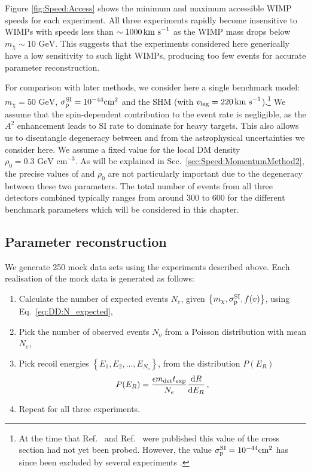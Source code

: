 Figure \ref{fig:Speed:Access} shows the minimum and maximum accessible WIMP speeds for each experiment. All three experiments rapidly become insensitive to WIMPs with speeds less than \(\sim 1000 \,\textrm{km s}^{-1}\) as the WIMP mass drops below \(m_\chi \sim 10 \textrm{ GeV}\). This suggests that the experiments considered here generically have a low sensitivity to such light WIMPs, producing too few events for accurate parameter reconstruction.

For comparison with later methods, we consider here a single benchmark model: \(m_\chi = 50 \textrm{ GeV}\), $\sigmapsi = 10^{-44} \mathrm{cm}^2$ and the SHM (with $v_\textrm{lag} = 220 \,\textrm{km s}^{-1}$).\footnote{At the time that Ref.~\cite{Peter:2011} and Ref.~\cite{Kavanagh:2012} were published this value of the cross section had not yet been probed. However, the value $\sigmapsi = 10^{-44} \mathrm{cm}^2$ has since been excluded by several experiments \cite{Aprile:2012b,Akerib:2014}.} We assume that the spin-dependent contribution to the event rate is negligible, as the $A^2$ enhancement leads to SI rate to dominate for heavy targets. This also allows us to disentangle degeneracy between \sigmapsi and \sigmapsd from the astrophysical uncertainties we consider here. We assume a fixed value for the local DM density $\rho_0 = 0.3 \textrm{ GeV cm}^{-3}$. As will be explained in Sec.\ \ref{sec:Speed:MomentumMethod2}, the precise values of \sigmapsi and \(\rho_0\) are not particularly important due to the degeneracy between these two parameters. The total number of events from all three detectors combined typically ranges from around 300 to 600 for the different benchmark parameters which will be considered in this chapter.

\subsection{Parameter reconstruction}
We generate 250 mock data sets using the experiments described above. Each realisation of the mock data is generated as follows:

\begin{enumerate}
\item Calculate the number of expected events $N_e$, given $\left\{m_\chi, \sigmapsi, f(v)\right\}$, using Eq.~\ref{eq:DD:N_expected},
\item Pick the number of observed events $N_o$ from a Poisson distribution with mean $N_e$,
\item Pick recoil energies $\left\{E_1, E_2, ..., E_{N_o}\right\}$, from the distribution $P(E_R)$ 
\begin{equation}
P(E_R) = \frac{\epsilon m_\textrm{det} t_\textrm{exp}}{N_e}\frac{\mathrm{d}R}{\mathrm{d}E_R}\,,
\end{equation}
\item Repeat for all three experiments.
\end{enumerate}

